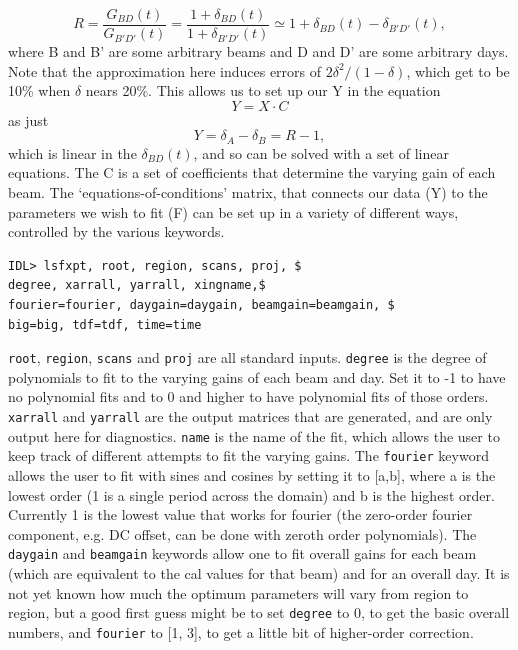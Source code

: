 \documentclass[11pt]{article}
\newcommand{\beq}{\begin{equation}}
\newcommand{\eeq}{\end{equation}}
\begin{document}
\beq
R = \frac{G_{BD}(t)}{G_{B'D'}(t)} = \frac{1+\delta_{BD}(t)}{1 + \delta_{B'D'}(t)} \simeq 1 + \delta_{BD}(t) - \delta_{B'D'}(t),
\eeq
where B and B' are some arbitrary beams and D and D' are some arbitrary days. Note that the approximation here induces errors of $2 \delta^2/\left(1-\delta\right)$, which get to be 10\% when $\delta$ nears 20\%. This allows us to set up our Y in the equation
\beq
Y = X \cdot C
\eeq
as just
\beq
Y = \delta_A - \delta_B = R-1,
\eeq
which is linear in the $\delta_{BD}(t)$, and so can be solved with a set of linear equations. The C is a set of coefficients that determine the varying gain of each beam. The `equations-of-conditions' matrix, that connects our data (Y) to the parameters we wish to fit (F)  can be set up in a variety of different ways, controlled by the various keywords.
\begin{verbatim}
IDL> lsfxpt, root, region, scans, proj, $
degree, xarrall, yarrall, xingname,$
fourier=fourier, daygain=daygain, beamgain=beamgain, $
big=big, tdf=tdf, time=time
\end{verbatim}
\texttt{root}, \texttt{region}, \texttt{scans} and \texttt{proj} are all standard inputs. \texttt{degree} is the degree of polynomials to fit to the varying gains of each beam and day. Set it to -1 to have no polynomial fits and to 0 and higher to have polynomial fits of those orders. \texttt{xarrall} and \texttt{yarrall} are the output matrices that are generated, and are only output here for diagnostics. \texttt{name} is the name of the fit, which allows the user to keep track of different attempts to fit the varying gains. The \texttt{fourier} keyword allows the user to fit with sines and cosines by setting it to [a,b], where a is the lowest order (1 is a single period across the domain) and b is the highest order. Currently 1 is the lowest value that works for fourier (the zero-order fourier component, e.g. DC offset, can be done with zeroth order polynomials). The \texttt{daygain} and \texttt{beamgain} keywords allow one to fit overall gains for each beam (which are equivalent to the cal values for that beam) and for an overall day. It is not yet known how much the optimum parameters will vary from region to region, but a good first guess might be to set \texttt{degree} to 0, to get the basic overall numbers, and \texttt{fourier} to [1, 3], to get a little bit of higher-order correction.
\end{document}
